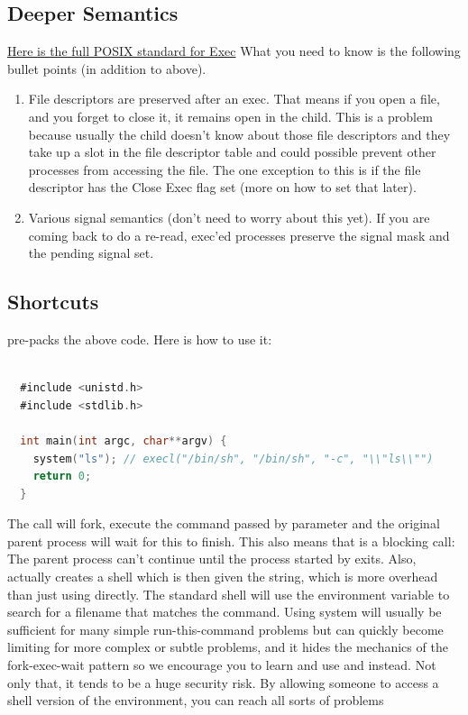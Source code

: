 \subsection{Deeper Semantics}

\href{https://pubs.opengroup.org/onlinepubs/009695399/functions/exec.html}{Here is the full POSIX standard for Exec}
What you need to know is the following bullet points (in addition to above).

\begin{enumerate}
\item File descriptors are preserved after an exec. That means if you open a file, and you forget to close it, it remains open in the child.
This is a problem because usually the child doesn't know about those file descriptors and they take up a slot in the file descriptor table and could possible prevent other processes from accessing the file. The one exception to this is if the file descriptor has the Close Exec flag set (more on how to set that later).
\item Various signal semantics (don't need to worry about this yet). If you are coming back to do a re-read, exec'ed processes preserve the signal mask and the pending signal set.
\end{enumerate}

\subsection{Shortcuts}

 pre-packs the above code. Here is how to use it:

\begin{lstlisting}[language=C]

  #include <unistd.h>
  #include <stdlib.h>

  int main(int argc, char**argv) {
    system("ls"); // execl("/bin/sh", "/bin/sh", "-c", "\\"ls\\"")
    return 0;
  }
\end{lstlisting}

The  call will fork, execute the command passed by parameter and the original parent process will wait for this to finish.
This also means that  is a blocking call: The parent process can't continue until the process started by  exits.
Also,  actually creates a shell which is then given the string, which is more overhead than just using  directly.
The standard shell will use the  environment variable to search for a filename that matches the command. Using system will usually be sufficient for many simple run-this-command problems but can quickly become limiting for more complex or subtle problems, and it hides the mechanics of the fork-exec-wait pattern so we encourage you to learn and use   and  instead.
Not only that, it tends to be a huge security risk. By allowing someone to access a shell version of the environment, you can reach all sorts of problems

